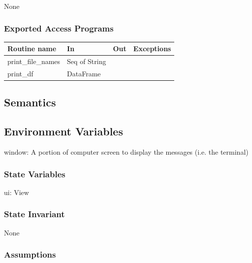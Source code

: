\documentclass[12pt]{article}
\begin{document}
None

\subsubsection* {Exported Access Programs}

\begin{tabular}{| l | l | l | p{5cm} |}
  \hline
  \textbf{Routine name} & \textbf{In} & \textbf{Out} & \textbf{Exceptions}\\
  \hline
  print\_file\_names & Seq of String & & \\
  \hline
  print\_df & DataFrame & & \\
  \hline
\end{tabular}

\subsection* {Semantics}

\subsection*{Environment Variables}

window: A portion of computer screen to display the messages (i.e. the terminal)

\subsubsection* {State Variables}

ui: View

\subsubsection* {State Invariant}

None

\subsubsection* {Assumptions}
\end{document}
